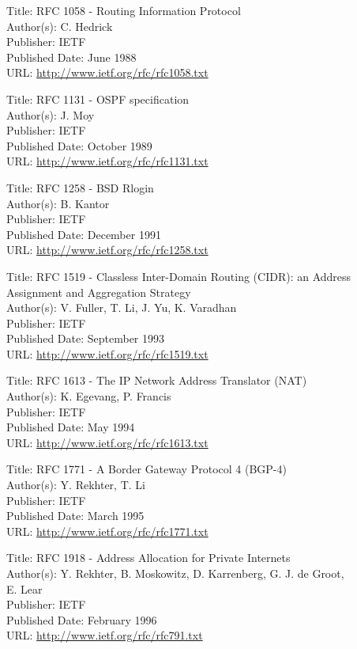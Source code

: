 \documentclass[a4paper,12pt]{article}
\begin{document}
Title: RFC 1058 - Routing Information Protocol \\
Author(s): C. Hedrick \\
Publisher: IETF \\
Published Date: June 1988 \\
URL: \url{http://www.ietf.org/rfc/rfc1058.txt}	 

Title: RFC 1131 - OSPF specification \\
Author(s): J. Moy \\
Publisher: IETF \\
Published Date: October 1989 \\
URL: \url{http://www.ietf.org/rfc/rfc1131.txt}	 

Title: RFC 1258 - BSD Rlogin \\
Author(s): B. Kantor \\
Publisher: IETF \\
Published Date: December 1991 \\
URL: \url{http://www.ietf.org/rfc/rfc1258.txt}	 

Title: RFC 1519 - Classless Inter-Domain Routing (CIDR): an Address \\
\hspace{15mm} Assignment and Aggregation Strategy \\
Author(s): V. Fuller, T. Li, J. Yu, K. Varadhan \\
Publisher: IETF \\
Published Date: September 1993  \\
URL: \url{http://www.ietf.org/rfc/rfc1519.txt}	 

Title: RFC 1613 - The IP Network Address Translator (NAT) \\
Author(s): K. Egevang, P. Francis \\
Publisher: IETF \\
Published Date: May 1994  \\
URL: \url{http://www.ietf.org/rfc/rfc1613.txt}	 

Title: RFC 1771 - A Border Gateway Protocol 4 (BGP-4) \\
Author(s): Y. Rekhter, T. Li \\
Publisher: IETF \\
Published Date: March 1995  \\
URL: \url{http://www.ietf.org/rfc/rfc1771.txt}	 

Title: RFC 1918 - Address Allocation for Private Internets \\
Author(s): Y. Rekhter, B. Moskowitz, D. Karrenberg, G. J. de Groot, \\
\hspace{15mm} E. Lear \\
Publisher: IETF \\
Published Date: February 1996  \\
URL: \url{http://www.ietf.org/rfc/rfc791.txt}	 
\end{document}
